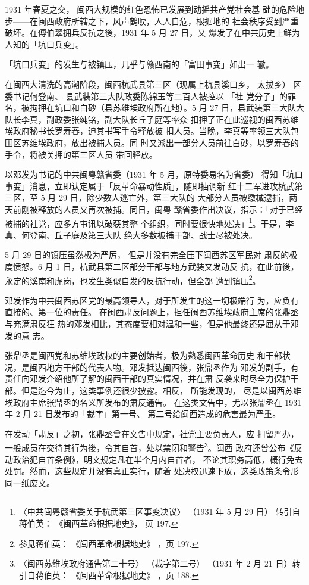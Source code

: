 1931 年春夏之交，
闽西大规模的红色恐怖已发展到动摇共产党社会基
础的危险地步——在闽西政府所辖之下，风声鹤唳，人人自危，根据地的
社会秩序受到严重破坏。在傅伯翠拥兵反抗之後，1931 年 5 月 27 日，又
爆发了在中共历史上鲜为人知的「坑口兵变」。

「坑口兵变」的发生与被镇压，几乎与赣西南的「富田事变」如出一
辙。

在闽西大清洗的高潮阶段，闽西杭武县第三区（现属上杭县溪口乡，
太拔乡）
区委书记何登南、
县武装第三大队政委陈锦玉等二百人被控以
「社
党分子」的罪名，被拘押在坑口和白砂（县苏维埃政府所在地）。5 月 27
日，县武装第三大队大队长李真，副政委张纯铭，副大队长丘子庭等率众
扣押了正在此巡视的闽西苏维埃政府秘书长罗寿春，迫其书写手令释放被
扣人员。当晚，李真等率领三大队包围区苏维埃政府，放出被捕人员。同
时又派出一部分人员前往白砂，以罗寿春的手令，将被关押的第三区人员
带回释放。
 
以邓发为书记的中共闽粤赣省委（1931 年 5 月，原特委易名为省委）
得知「坑口事变」消息，立即认定属于「反革命暴动性质」，随即抽调新
红十二军进攻杭武第三区，至 5 月 29 日，除少数人逃亡外，第三大队的
大部分人员被缴械逮捕，两天前刚被释放的人员又再次被捕。同日，闽粤
赣省委作出决议，指示：「对于已经被捕的社党，应多方审讯以破获其整
个组织，同时要很快地处决」\footnote{〈中共闽粤赣省委关于杭武第三区事变决议〉 （1931 年 5 月 29 日）
转引自蒋伯英：
《闽西革命根据地史》， 页 197.}。于是，李真、何登南、丘子庭及第三大队
绝大多数被捕干部、战士尽被处决。
 
5 月 29 日的镇压虽然极为严厉，
但是并没有完全压下闽西苏区军民对
肃反的极度愤怒。6 月 1 日，杭武县第二区部分干部与地方武装又发动反
抗，在此前後，永定的溪南和虎岗，也发生类似自发的反抗行动，但全部
遭到镇压\footnote{参见蒋伯英：
《闽西革命根据地史》 ，页 197.}。
 
邓发作为中共闽西苏区党的最高领导人，对于所发生的这一切极端行
为，应负有直接的、第一位的责任。
在闽西肃反问题上，担任闽西苏维埃政府主席的张鼎丞与充满肃反狂
热的邓发相比，其态度要相对温和一些，但是他最终还是屈从于邓发的意
志。
 
张鼎丞是闽西党和苏维埃政权的主要创始者，极为熟悉闽西革命历史
和干部状况，是闽西地方干部的代表人物。邓发抵达闽西後，张鼎丞作为
邓发的副手，有责任向邓发介绍他所了解的闽西干部的真实情况，并在肃
反袭来时尽全力保护干部。但是迄今为止，这类事例还很少披露。相反，
所能发现的，
尽是以闽西苏维埃政府主席张鼎丞的名义所发布的肃反通告。
在这类文告中，尤以张鼎丞在 1931 年 2 月 21 日发布的「裁字」第一号、
第二号给闽西造成的危害最为严重。
 
在发动「肃反」之初，张鼎丞曾在文告中规定，社党主要负责人，应
扣留严办，一般成员在交待其行为後，令其自首，处以禁闭和警告\footnote{〈闽西苏维埃政府通告第二十号〉
（裁字第二号） （1931 年 2 月 21 日）转引自蒋伯英： 《闽西革命根据地史》 ，页
188.}。闽西
政府还曾公布《反动政治犯自首条例》，明文规定凡在半个月内自首者，
不论其职务高低，概行免去处罚。然而，这些规定并没有真正实行，随着
处决权迅速下放，这类政策条令形同一纸废文。

